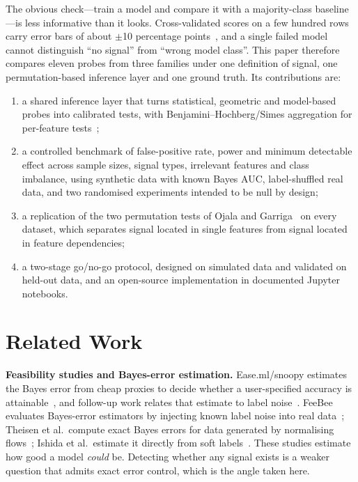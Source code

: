 The obvious check---train a model and compare it with a majority-class baseline---is less informative than it looks. Cross-validated scores on a few hundred rows carry error bars of about $\pm$10 percentage points~\cite{varoquaux2018}, and a single failed model cannot distinguish ``no signal'' from ``wrong model class''. This paper therefore compares eleven probes from three families under one definition of signal, one permutation-based inference layer and one ground truth. Its contributions are:
\begin{enumerate}
\item a shared inference layer that turns statistical, geometric and model-based probes into calibrated tests, with Benjamini--Hochberg/Simes aggregation for per-feature tests~\cite{korthauer2019};
\item a controlled benchmark of false-positive rate, power and minimum detectable effect across sample sizes, signal types, irrelevant features and class imbalance, using synthetic data with known Bayes AUC, label-shuffled real data, and two randomised experiments intended to be null by design;
\item a replication of the two permutation tests of Ojala and Garriga~\cite{ojala2010} on every dataset, which separates signal located in single features from signal located in feature dependencies;
\item a two-stage go/no-go protocol, designed on simulated data and validated on held-out data, and an open-source implementation in documented Jupyter notebooks.
\end{enumerate}

\section{Related Work}
\label{sec:related}

\textbf{Feasibility studies and Bayes-error estimation.} Ease.ml/snoopy estimates the Bayes error from cheap proxies to decide whether a user-specified accuracy is attainable~\cite{renggli2020snoopy}, and follow-up work relates that estimate to label noise~\cite{renggli2023feasibility}. FeeBee evaluates Bayes-error estimators by injecting known label noise into real data~\cite{renggli2021feebee}; Theisen et al.\ compute exact Bayes errors for data generated by normalising flows~\cite{theisen2021}; Ishida et al.\ estimate it directly from soft labels~\cite{ishida2023}. These studies estimate how good a model \emph{could} be. Detecting whether any signal exists is a weaker question that admits exact error control, which is the angle taken here.

